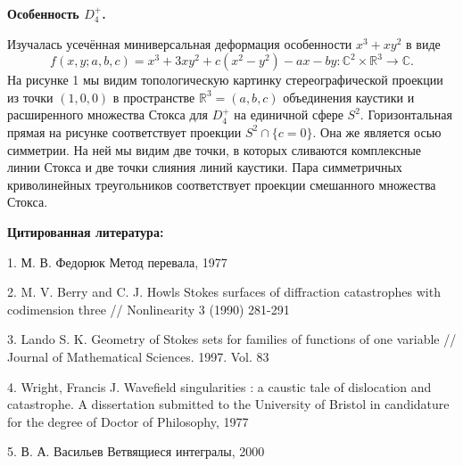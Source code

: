\textbf{Особенность $D_{4}^+$.}

	Изучалась усечённая миниверсальная деформация особенности $x^3+xy^2$ в виде $$f(x,y;a,b,c)=x^3+3xy^2+c(x^2-y^2)-ax-by:\mathbb{C}^2\times\mathbb{R}^3\rightarrow\mathbb{C}.$$ На рисунке 1 мы видим топологическую картинку стереографической проекции из точки $(1,0,0)$ в пространстве $\mathbb{R}^3=(a,b,c)$ объединения каустики и расширенного множества Стокса для $D_4^+$ на единичной сфере $S^2.$ Горизонтальная прямая на рисунке соответствует проекции $S^2\cap\{c=0\}$. Она же является осью симметрии. На ней мы видим две точки, в которых сливаются комплексные линии Стокса и две точки слияния линий каустики. Пара симметричных криволинейных треугольников соответствует проекции смешанного множества Стокса.



\begin{center}
	\textbf{Цитированная литература:}
\end{center}
\par
1. М. В. Федорюк Метод перевала, 1977


2. M. V. Berry and C. J. Howls Stokes surfaces of diffraction catastrophes with codimension three // Nonlinearity 3 (1990) 281-291

3. Lando S. K. Geometry of Stokes sets for families of functions of one
variable // Journal of Mathematical Sciences. 1997. Vol. 83

4. Wright, Francis J. Wavefield singularities : a caustic tale of dislocation and catastrophe. A dissertation submitted to the University of Bristol
in candidature for the degree of Doctor of Philosophy, 1977


5. В. А. Васильев Ветвящиеся интегралы, 2000
